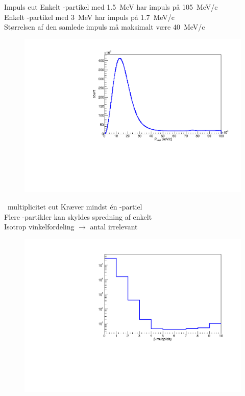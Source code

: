 \begin{frame}{Impuls cut}
	Enkelt \al-partikel med \SI{1.5}{MeV} har impuls på \SI{105}{MeV/c}\\
	Enkelt \be-partikel med \SI{3}{MeV} har impuls på \SI{1.7}{MeV/c}\\
	Størrelsen af den samlede impuls må maksimalt være \SI{40}{MeV/c}
	\begin{figure}
		\centering
		\includegraphics[width=.7\columnwidth]{../figures/ptotNoCut.pdf}
	\end{figure}
\end{frame}

\begin{frame}{\be\ multiplicitet cut}
	Kræver mindst én \be-partiel\\
	Flere \be-partikler kan skyldes spredning af enkelt \be\\
	Isotrop vinkelfordeling $\rightarrow$ antal irrelevant
	\begin{figure}
		\includegraphics[width=.7\columnwidth]{../figures/betaMul.pdf}
	\end{figure}
\end{frame}
